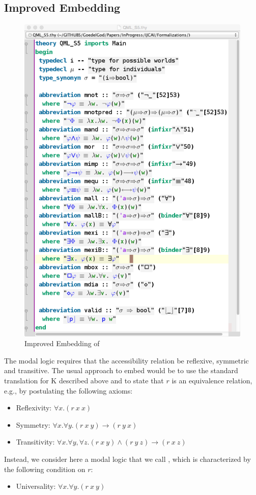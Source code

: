 \documentclass{article}
\begin{document}
\subsection{Improved Embedding \SFiveU}\label{sec:improvedembedding}
\begin{figure}[t]
\centerline{\includegraphics[width=\columnwidth]{./Images/QML_S5.png}}
\caption{Improved Embedding of \SFiveU} \label{QML_S5}
\end{figure}

The modal logic \SFive requires that the accessibility relation be
reflexive, symmetric and transitive. The usual approach to embed
\SFive would be to use the standard translation for K described above
and to state that $r$ is an equivalence relation, e.g., by postulating
the following axioms:
\begin{itemize}
\item Reflexivity: $\forall x. (r~x~x)$
\item Symmetry: $\forall x. \forall y. (r~x~y) \rightarrow (r~y~x)$ 
\item Transitivity: $\forall x. \forall y, \forall z. (r~x~y) \wedge (r~y~z) \rightarrow (r~x~z)$
\end{itemize}
Instead, we consider here a modal logic that we call \SFiveU, which is
characterized by the following condition on $r$:
\begin{itemize}
\item Universality: $\forall x. \forall y. (r~x~y)$
\end{itemize}
\end{document}
